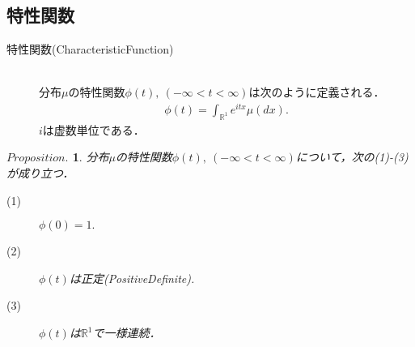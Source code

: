 \documentclass[a4j,papersize,disablejfam,slide,14pt]{jsarticle}
\newtheorem{Prop}{$Proposition.$}
\def\exp#1{e^{#1}} %
\begin{document}
\subsection{特性関数}
    \begin{screen}
    	\begin{description}
        	\item[特性関数({\rm Characteristic\quad Function})]\mbox{}\\
            	分布$\mu$の特性関数$\phi(t),\ (-\infty < t < \infty)$は次のように定義される．
                \begin{align}
            		\phi(t) = \int_{\mathbb{R}^1} \exp{itx} \mu(dx).
                \end{align}
                $i$は虚数単位である．
        \end{description}
    \end{screen}
    \begin{screen}
    	\begin{Prop}
        	分布$\mu$の特性関数$\phi(t),\ (-\infty < t < \infty)$について，次の(1)-(3)が成り立つ．
            \begin{description}
            	\item[(1)] $\phi(0) = 1.$
            	\item[(2)] $\phi(t)$は正定({\rm Positive\quad Definite}).
            	\item[(3)] $\phi(t)$は$\mathbb{R}^1$で一様連続．
            \end{description}
        \end{Prop}
    \end{screen}
\end{document}

